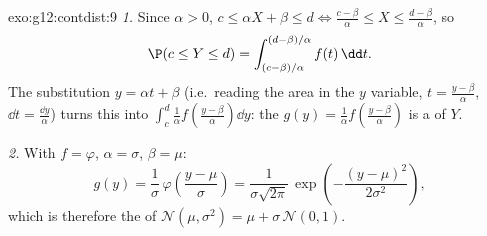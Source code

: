 \begin{solution}{exo:g12:contdist:9}
\emph{1.} Since $\alpha > 0$, $c \leq \alpha X + \beta \leq d
\iff \frac{c - \beta}{\alpha} \leq X \leq \frac{d - \beta}{\alpha}$, so
\[
\P(c \leq Y \leq d)
= \int_{(c-\beta)/\alpha}^{(d-\beta)/\alpha} f(t)\,\dd t .
\]
The substitution $y = \alpha t + \beta$ (i.e.\ reading the area in the $y$
variable, $t = \frac{y - \beta}{\alpha}$, $\dd t = \frac{\dd y}{\alpha}$)
turns this into
$\int_c^d \frac{1}{\alpha} f\left(\frac{y-\beta}{\alpha}\right)\dd y$: the
 $g(y) = \frac1\alpha f\left(\frac{y-\beta}{\alpha}\right)$ is a
 of $Y$.

\emph{2.} With $f = \varphi$, $\alpha = \sigma$, $\beta = \mu$:
\[
g(y) = \frac{1}{\sigma}\,\varphi\!\left(\frac{y - \mu}{\sigma}\right)
= \frac{1}{\sigma\sqrt{2\pi}}\,
\exp\left(-\frac{(y-\mu)^2}{2\sigma^2}\right),
\]
which is therefore the  of
$\mathcal N(\mu, \sigma^2) = \mu + \sigma\,\mathcal N(0,1)$.
\end{solution}

